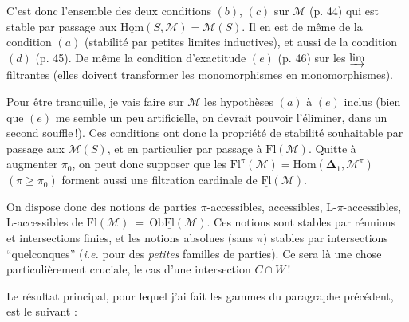 \documentclass[11pt]{article}
\newcommand{\printedpage}[1]{\marginpar{\footnotesize p.~#1}}
\newcommand{\msp}[1]{\marginpar{\footnotesize [#1]}}
\newcommand{\Ob}{\mathrm{Ob}}
\newcommand{\Fl}{\mathrm{Fl}}
\newcommand{\uHom}{\underline{\mathrm{Hom}}}
\newcommand{\uFl}{\underline{\mathrm{Fl}}}
\begin{document}
C'est donc l'ensemble des deux conditions $(b)$, $(c)$ sur $\mathcal{M}$ (p. 44) qui est stable par passage aux $\uHom(S,\mathcal{M}) = \mathcal{M}(S)$. Il en est de même de la condition $(a)$ (stabilité par petites limites inductives), et aussi de la condition\msp{page 75}
$(d)$ (p. 45). De même la condition d'exactitude $(e)$ (p. 46) sur les $\varinjlim$ filtrantes (elles doivent transformer les monomorphismes en monomorphismes).

Pour être tranquille, je vais faire sur $\mathcal{M}$ les hypothèses $(a)$ à $(e)$ inclus (bien que $(e)$ me semble un peu artificielle, on devrait pouvoir l'éliminer, dans un second souffle\,!). Ces conditions ont donc la propriété de stabilité souhaitable par passage aux $\mathcal{M}(S)$, et en particulier par passage à $\Fl(\mathcal{M})$. Quitte à augmenter $\pi_{0}$, on peut donc supposer que les $\Fl^{\pi}(\mathcal{M}) = \mathrm{Hom}(\boldsymbol{\Delta}_{1},\mathcal{M}^{\pi})$ $(\pi \geq \pi_{0})$ forment aussi une filtration cardinale de $\uFl(\mathcal{M})$.

On dispose donc des notions de parties $\pi$-accessibles, accessibles, L-$\pi$-accessibles, L-accessibles de $\Fl(\mathcal{M}) \ = \ \Ob\uFl(\mathcal{M})$. Ces notions sont stables par réunions et intersections finies, et les notions absolues (sans $\pi$) stables par intersections ``quelconques'' (\textit{i.e.} pour des \textit{petites} familles de parties). Ce sera là une chose particulièrement\printedpage{42}%
\msp{page 76}
cruciale, le cas d'une intersection $C \cap W$\,!

Le résultat principal, pour lequel j'ai fait les gammes du paragraphe précédent, est le suivant :
\end{document}
